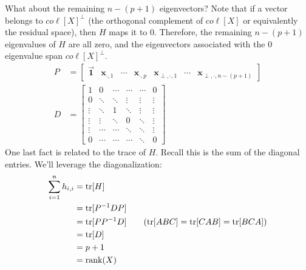 \documentclass[12pt, a4paper]{article}
\theoremstyle{definition}
\begin{document}
	What about the remaining $n-(p+1)$ eigenvectors? Note that if a vector belongs to
	$co\ell[X]^\perp$ (the orthogonal complement of $co\ell[X]$ or equivalently the residual space),
	then $H$ maps it to $0$. Therefore, the remaining $n-(p+1)$ eigenvalues of $H$ are all zero,
	and the eigenvectors associated with the $0$ eigenvalue span $co\ell[X]^\perp$.
	\begin{align*}
		P&=\begin{bmatrix}
			\vec{\mathbf{1}} & \mathbf{x}_{\cdot, 1} & \cdots & \mathbf{x}_{\cdot, p}
			& \mathbf{x}_{\perp, \cdot, 1} & \cdots & \mathbf{x}_{\perp, \cdot, n-(p+1)}
		\end{bmatrix}\\
		D&=\begin{bmatrix}
			1 &0 & \cdots & \cdots &\cdots & 0\\
			0 & \ddots & \ddots & \vdots & \vdots & \vdots\\
			\vdots & \ddots & 1 & \ddots &\vdots & \vdots\\
			\vdots & \vdots & \ddots & 0 & \ddots & \vdots\\
			\vdots & \cdots & \cdots &\ddots  & \ddots & \vdots\\
			0 & \cdots & \cdots & \cdots & \ddots & 0
		\end{bmatrix}
	\end{align*}
	One last fact is related to the trace of $H$. Recall this is the sum of the diagonal
	entries. We'll leverage the diagonalization:
	\begin{align*}
		\sum_{i=1}^{n}h_{i,i}&=\text{tr}[H]\\
		&=\text{tr}[P^{-1}DP]\\
		&=\text{tr}[PP^{-1}D]
		\tag{$\text{tr}[ABC]=\text{tr}[CAB]=\text{tr}[BCA]$}\\
		&=\text{tr}[D]\\
		&=p+1\\
		&=\text{rank}(X)
	\end{align*}
	\pagebreak
	\printbibliography
\end{document}

